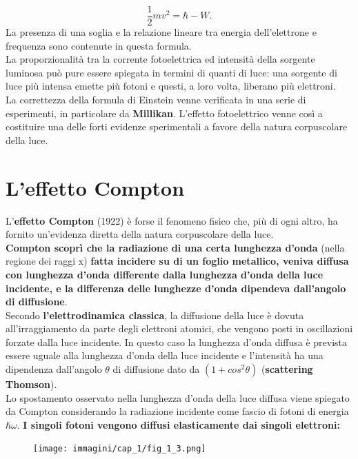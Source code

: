 	\begin{equation}
		\boxed{
			\frac{1}{2}m v^2= \hbar - W.
			}
	\end{equation}
La presenza di una soglia e la relazione lineare tra energia dell'elettrone e frequenza sono contenute in questa formula.\\
La proporzionalità tra la corrente fotoelettrica ed intensità della sorgente luminosa può pure essere spiegata in termini di quanti di luce: una sorgente di luce più intensa emette più fotoni e questi, a loro volta, liberano più elettroni.\\
La correttezza della formula di Einstein venne verificata in una serie di esperimenti, in particolare da \textbf{Millikan}. L'effetto fotoelettrico venne così a costituire una delle forti evidenze sperimentali a favore della natura corpuscolare della luce.
\section{L'effetto Compton}
L'\textbf{effetto Compton} (1922) è forse il fenomeno fisico che, più di ogni altro, ha fornito un'evidenza diretta della natura corpuscolare della luce.\\
\textbf{Compton scoprì che la radiazione di una certa lunghezza d'onda} (nella regione dei raggi x) \textbf{fatta incidere su di un foglio metallico, veniva diffusa con lunghezza d'onda differente dalla lunghezza d'onda della luce incidente, e la differenza delle lunghezze d'onda dipendeva dall'angolo di diffusione}.\\
Secondo \textbf{l'elettrodinamica classica}, la diffusione della luce è dovuta all'irraggiamento da parte degli elettroni atomici, che vengono posti in oscillazioni forzate dalla luce incidente. In questo caso la lunghezza d'onda diffusa è prevista essere uguale alla lunghezza d'onda della luce incidente e l'intensità ha una dipendenza dall'angolo $\theta$ di diffusione dato da $(1+cos^2 \theta)$ (\textbf{scattering Thomson}).\\
Lo spostamento osservato nella lunghezza d'onda della luce diffusa viene spiegato da Compton considerando la radiazione incidente come fascio di fotoni di energia $\hbar \omega$. \textbf{I singoli fotoni vengono diffusi elasticamente dai singoli elettroni:}
\newpage
	\begin{figure}[!htbp]
		\begin{center}
			\texttt{[image: immagini/cap\_1/fig\_1\_3.png]}
		\end{center}
	\end{figure}
